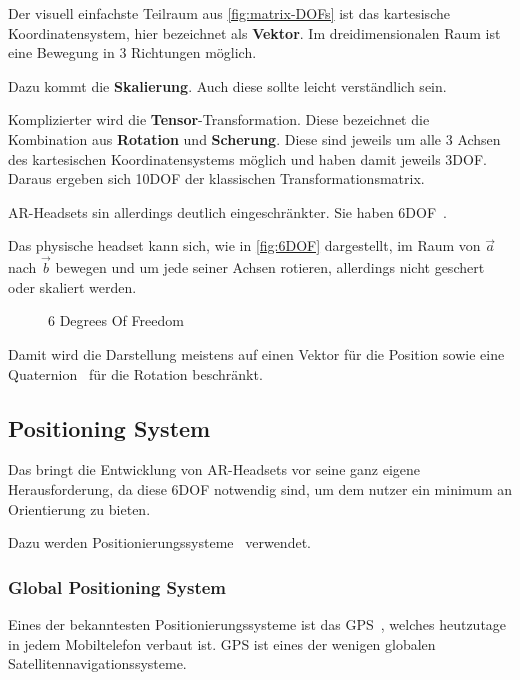     Der visuell einfachste Teilraum aus \autoref{fig:matrix-DOFs} ist das kartesische Koordinatensystem, hier bezeichnet als \textbf{Vektor}.
    Im dreidimensionalen Raum ist eine Bewegung in 3 Richtungen möglich.

    Dazu kommt die \textbf{Skalierung}.
    Auch diese sollte leicht verständlich sein.

    Komplizierter wird die \textbf{Tensor}-Transformation.
    Diese bezeichnet die Kombination aus \textbf{Rotation} und \textbf{Scherung}.
    Diese sind jeweils um alle 3 Achsen des kartesischen Koordinatensystems möglich und haben damit jeweils 3DOF\@.
    Daraus ergeben sich 10DOF der klassischen Transformationsmatrix.

    AR-Headsets sin allerdings deutlich eingeschränkter.
    Sie haben 6DOF~\autocite{wikipedia-contributors-2023B}.

    Das physische headset kann sich, wie in \autoref{fig:6DOF} dargestellt, im Raum von $\vec{a}$ nach $\vec{b}$ bewegen und um jede seiner Achsen rotieren, allerdings nicht geschert oder skaliert werden.
    \begin{figure}[ht!]
        \label{fig:6DOF}
        \center
        
        \caption{6 Degrees Of Freedom~\autocite{wikipedia-contributors-2023B}}
    \end{figure}
    Damit wird die Darstellung meistens auf einen Vektor für die Position sowie eine Quaternion~\autocite{wikipedia-contributors-2023G} für die Rotation beschränkt.

\subsection{Positioning System}\label{subsec:positioning-system}
    Das bringt die Entwicklung von AR-Headsets vor seine ganz eigene Herausforderung, da diese 6DOF notwendig sind, um dem nutzer ein minimum an Orientierung zu bieten.

    Dazu werden Positionierungssysteme~\autocite{wikipedia-contributors-2023A} verwendet.

    \subsubsection{Global Positioning System}\label{subsubsec:global-positioning-system}
        Eines der bekanntesten Positionierungssysteme ist das GPS~\autocite{wikipedia-contributors-2023J}, welches heutzutage in jedem Mobiltelefon verbaut ist.
        GPS ist eines der wenigen globalen Satellitennavigationssysteme.

